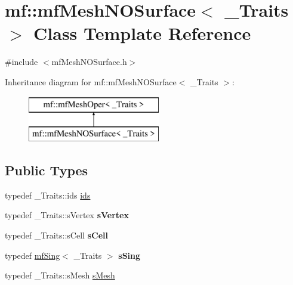 \hypertarget{classmf_1_1mfMeshNOSurface}{
\section{mf::mfMeshNOSurface$<$ \_\-Traits $>$ Class Template Reference}
\label{classmf_1_1mfMeshNOSurface}
}


{\ttfamily \#include $<$mfMeshNOSurface.h$>$}

Inheritance diagram for mf::mfMeshNOSurface$<$ \_\-Traits $>$:\begin{figure}[H]
\begin{center}
\leavevmode
\includegraphics[height=2.000000cm]{classmf_1_1mfMeshNOSurface}
\end{center}
\end{figure}
\subsection*{Public Types}
\begin{DoxyCompactItemize}
\item 
typedef \_\-Traits::ids \hyperlink{classmf_1_1mfMeshNOSurface_afee75f2d037d52e9a164fca832091c9b}{ids}
\item 
\hypertarget{classmf_1_1mfMeshNOSurface_a64fc49ba31ca5846cb969890573053bb}{
typedef \_\-Traits::sVertex {\bfseries sVertex}}
\label{classmf_1_1mfMeshNOSurface_a64fc49ba31ca5846cb969890573053bb}

\item 
\hypertarget{classmf_1_1mfMeshNOSurface_a2fa1df913ec1d90af922ece363bcfef1}{
typedef \_\-Traits::sCell {\bfseries sCell}}
\label{classmf_1_1mfMeshNOSurface_a2fa1df913ec1d90af922ece363bcfef1}

\item 
\hypertarget{classmf_1_1mfMeshNOSurface_a5a69aa6fc01bfba39c6161159612c8ef}{
typedef \hyperlink{classmf_1_1mfSing}{mfSing}$<$ \_\-Traits $>$ {\bfseries sSing}}
\label{classmf_1_1mfMeshNOSurface_a5a69aa6fc01bfba39c6161159612c8ef}

\item 
typedef \_\-Traits::sMesh \hyperlink{classmf_1_1mfMeshNOSurface_af5a7f4fc5fe7b228d1e96f5f37ee2dba}{sMesh}
\end{DoxyCompactItemize}
